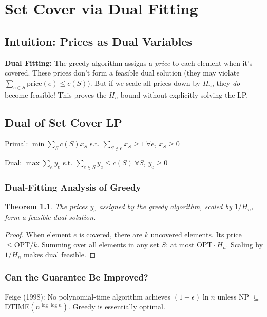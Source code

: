 \documentclass[11pt,oneside]{book}
\newtheorem{theorem}{Theorem}[chapter]
\newcommand{\OPT}{\mathrm{OPT}}
\begin{document}
\chapter{Set Cover via Dual Fitting}
\label{ch:setcover_dual}

\section{Intuition: Prices as Dual Variables}

\begin{intuitionbox}
\textbf{Dual Fitting:} The greedy algorithm assigns a \emph{price} to each element when it's covered. These prices don't form a feasible dual solution (they may violate $\sum_{e \in S} \text{price}(e) \leq c(S)$). But if we scale all prices down by $H_n$, they \emph{do} become feasible! This proves the $H_n$ bound without explicitly solving the LP.
\end{intuitionbox}

\section{Dual of Set Cover LP}

Primal: $\min \sum_S c(S) x_S$ s.t. $\sum_{S \ni e} x_S \geq 1 \ \forall e$, $x_S \geq 0$

Dual: $\max \sum_e y_e$ s.t. $\sum_{e \in S} y_e \leq c(S) \ \forall S$, $y_e \geq 0$

\subsection{Dual-Fitting Analysis of Greedy}

\begin{theorem}
The prices $y_e$ assigned by the greedy algorithm, scaled by $1/H_n$, form a feasible dual solution.
\end{theorem}
\begin{proof}
When element $e$ is covered, there are $k$ uncovered elements. Its price $\leq \OPT/k$. Summing over all elements in any set $S$: at most $\OPT \cdot H_n$. Scaling by $1/H_n$ makes dual feasible.
\end{proof}

\subsection{Can the Guarantee Be Improved?}

Feige (1998): No polynomial-time algorithm achieves $(1-\epsilon)\ln n$ unless NP $\subseteq$ DTIME$(n^{\log\log n})$. Greedy is essentially optimal.
\end{document}
